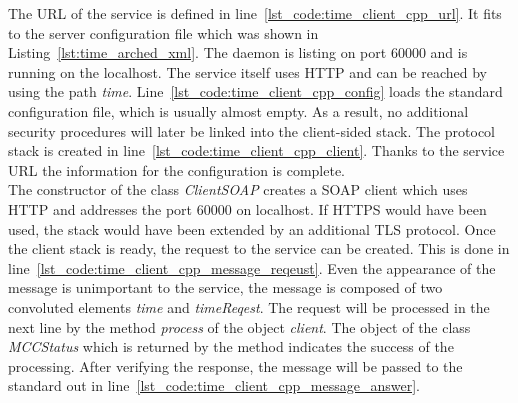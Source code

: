The URL of the service is defined in line~\ref{lst_code:time_client_cpp_url}.
It fits to the server configuration file which was shown in Listing~\ref{lst:time_arched_xml}.
The daemon is listing on port 60000 and is running on the localhost. The service itself uses HTTP and can be reached by using the path \textit{time}.
Line~\ref{lst_code:time_client_cpp_config} loads the standard configuration file, which is usually almost empty.
As a result, no additional security procedures will later be linked into the client-sided stack. 
The protocol stack is created in line~\ref{lst_code:time_client_cpp_client}. 
Thanks to the service URL the information for the configuration is complete.\\


The constructor of the class \textit{ClientSOAP} creates a SOAP client which uses HTTP and addresses the port 60000 on localhost.
If HTTPS would have been used, the stack would have been extended by an additional TLS protocol.
Once the client stack is ready, the request to the service can be created.
This is done in line~\ref{lst_code:time_client_cpp_message_reqeust}.
Even the appearance of the message is unimportant to the service, the message is composed of two convoluted elements \textit{time} and \textit{timeReqest}.
%
The request will be processed in the next line by the method \textit{process} of the object \textit{client}.%
The object of the class \textit{MCCStatus} which is returned by the method indicates the success of the processing.
After verifying the response, the message will be passed to the standard out in line~\ref{lst_code:time_client_cpp_message_answer}. \\


